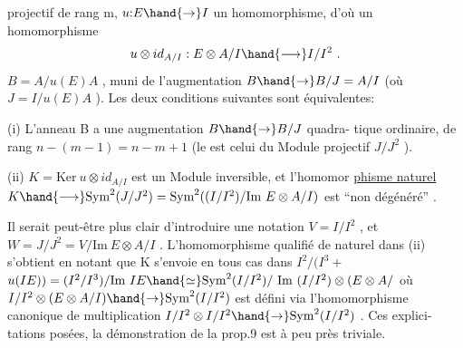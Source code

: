 
projectif de rang m,  $u{:}E \hand{\to} I$ un homomorphisme, d'où un homomorphisme
\[ u\otimes id_{A/I} : E\otimes A/I \hand{\longrightarrow} I/I^2 \ . \]
  $B = A/u(E)A$ , muni de l'augmentation $B\hand{\to} B/J = A/I$
(où $J = I/u(E)A$ ). Les deux conditions suivantes sont équivalentes:

 (i) L'anneau  B  a une augmentation $B\hand{\to} B/J$  quadra-%
tique ordinaire, de rang $n-(m-1)= n-m+1$ (le 
est  celui du Module projectif $J/J^2$ ).

 (ii) $K = \mathrm{Ker}\ u\otimes id_{A/I}$ est un Module inversible, et l'homomor
\uline{phisme naturel} $K \hand{\longrightarrow} \mathrm{Sym}^2(J/J^2) = \mathrm{Sym}^2( (I/I^2)/\mathrm{Im}\ E\otimes A/I )$ est
``non dégénéré'' .

Il serait peut-être plus clair d'introduire une notation $V = I/I^2$ ,
et $W = J/J^2 = V / \mathrm{Im}\ E\otimes A/I$ . L'homomorphisme qualifié de naturel
dans (ii) s'obtient en notant que K s'envoie en tous cas dans
 $I^2/(I^3 +$  $u(IE)) = (I^2/I^3)/\mathrm{Im}\ IE \hand{\simeq} \mathrm{Sym}^2(I/I^2)/\ \mathrm{Im}\ (I/I^2)\otimes(E\otimes A/$
où $I/I^2 \otimes(E \otimes A/I) \hand{\to} \mathrm{Sym}^2(I/I^2)$ est défini via l'homomorphisme
canonique de multiplication $I/I^2 \otimes I/I^2 \hand{\to} \mathrm{Sym}^2(I/I^2 )$ . Ces explici-%
tations posées, la démonstration de la prop.9 est à peu près triviale.

